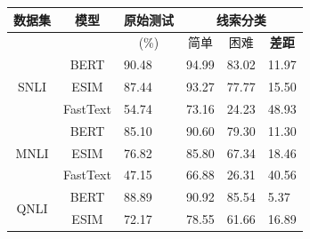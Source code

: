 \begin{table}[th]
    \small
    \centering
    \begin{tabular}{ccllll}
    \toprule
    数据集                                     & \multicolumn{1}{c}{模型} & \multicolumn{1}{c}{原始测试} & \multicolumn{3}{c}{线索分类}                                                                                        \\ \midrule
                                                 &                            & \multicolumn{1}{c}{(\%)}      & \multicolumn{1}{c}{简单} & \multicolumn{1}{c}{困难} & \multicolumn{1}{c}{\textbf{差距}} \\ \midrule
    \multicolumn{1}{c}{\multirow{3}{*}{SNLI}}   & BERT                       & \multicolumn{1}{l}{90.48}    & 94.99                         & 83.02                         & 11.97                         \\
    \multicolumn{1}{c}{}                        & ESIM                       & \multicolumn{1}{l}{87.44}    & 93.27                         & 77.77                         & 15.50                         \\
    \multicolumn{1}{c}{}                        & FastText                   & \multicolumn{1}{l}{54.74}    & 73.16                         & 24.23                         & 48.93                        \\ \midrule
    \multicolumn{1}{c}{\multirow{3}{*}{MNLI}}   & BERT                       & \multicolumn{1}{l}{85.10}    & 90.60                         & 79.30                         & 11.30        \\
    \multicolumn{1}{c}{}                        & ESIM                       & \multicolumn{1}{l}{76.82}    & 85.80                         & 67.34                         & 18.46                    \\
    \multicolumn{1}{c}{}                        & FastText                   & \multicolumn{1}{l}{47.15}    & 66.88                         & 26.31                         & 40.56                    \\ \midrule
    \multicolumn{1}{c}{\multirow{3}{*}{QNLI}}   & BERT                       & \multicolumn{1}{l}{88.89}    & 90.92                         & 85.54                         & 5.37             \\
    \multicolumn{1}{c}{}                        & ESIM                       & \multicolumn{1}{l}{72.17}    & 78.55                         & 61.66                         & 16.89                \\

\end{tabular}
\end{table}
